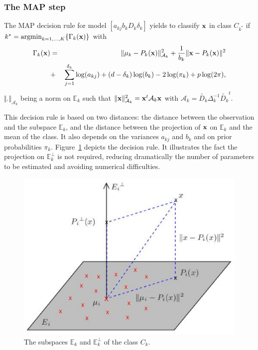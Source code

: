 \documentclass[12pt]{article}
\newcommand{\argmin}{\mathop{\mathrm{argmin}}}
\begin{document}
\subsubsection{The MAP step}
The MAP decision rule for model $[a_{kj}b_{k}D_{k}\delta_{k}]$ yields to classify ${\bf x}$ in
class $C_{k^{*}}$ if $k^{*}=\argmin_{k=1,...,K}\{ \Gamma_{k}({\bf x})\}$ with
\begin{eqnarray*}
  \Gamma_{k}({\bf x})&=&\Vert\mu_{k}-P_{k}({\bf x})\Vert_{\mathcal{A}_{k}}^{2}
  +\frac{1}{b_{k}}\Vert {\bf x}-P_{k}({\bf x})\Vert^{2}\\
  &+& \sum_{j=1}^{\delta_{k}}\log(a_{kj})+(d-\delta_{k})\log(b_{k})-2\log(\pi_{k})+p\log(2\pi),
\end{eqnarray*}
$\Vert.\Vert_{\mathcal{A}_{k}}$ being a norm on $\mathbb{E}_k$ such that $\Vert {\bf x}
\Vert^{2}_{\mathcal{A}_{k}}={\bf x}^t\mathcal{A}_{k}{\bf x}$ with
$\mathcal{A}_{k}=\tilde{D_{k}}\Delta_{k}^{-1}\tilde{D_{k}}^{t}$.

This decision rule is based on two distances: the distance between the observation and the
subspace $\mathbb{E}_{k}$, and the distance between the projection of ${\bf x}$ on
$\mathbb{E}_{k}$ and the mean of the class. It also depends on the variances $a_{kj}$ and
$b_{k}$ and on prior probabilities $\pi_{k}$. Figure~\ref{cap:Illustration_model} depicts the
decision rule.  It illustrates the fact the projection on $\mathbb{E}_{k}^{\perp}$ is not
required, reducing dramatically the number of parameters to be estimated and avoiding numerical
difficulties.

\begin{figure}[]
  \begin{center}
    \includegraphics[scale=0.55]{illustration_1.eps}
  \end{center}
  \caption{\label{cap:Illustration_model}The subspaces $\mathbb{E}_{k}$ and
    $\mathbb{E}_{k}^{\perp}$ of the class $C_{k}$.}
\end{figure}
\end{document}
